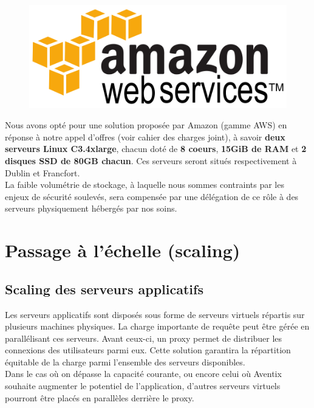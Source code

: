 \begin{figure}[H]
    \centering
    \includegraphics[width=\textwidth]{aws}
\end{figure}

Nous avons opté pour une solution proposée par Amazon (gamme AWS) en réponse à notre appel d'offres (voir cahier des charges joint), à savoir
\textbf{deux serveurs Linux C3.4xlarge}, chacun doté de \textbf{8 coeurs},
\textbf{15GiB de RAM} et \textbf{2 disques SSD de 80GB chacun}. Ces serveurs
seront situés respectivement à Dublin et Francfort. \\

La faible volumétrie de stockage, à laquelle nous sommes contraints par les
enjeux de sécurité soulevés, sera compensée par une délégation de ce rôle à
des serveurs physiquement hébergés par nos soins.

\section{Passage à l'échelle (scaling)}
\label{sec:scaling}

\subsection{Scaling des serveurs applicatifs}
\label{subsec:scaling-applicatif}

Les serveurs applicatifs sont disposés sous forme de serveurs virtuels
répartis sur plusieurs machines physiques. La charge importante de requête
peut être gérée en parallélisant ces serveurs. Avant ceux-ci, un proxy permet
de distribuer les connexions des utilisateurs parmi eux. Cette solution
garantira la répartition équitable de la charge parmi l'ensemble des serveurs
disponibles. \\

Dans le cas où on dépasse la capacité courante, ou encore celui où Aventix souhaite
augmenter le potentiel de l'application, d'autres serveurs virtuels pourront
être placés en parallèles derrière le proxy. \\

